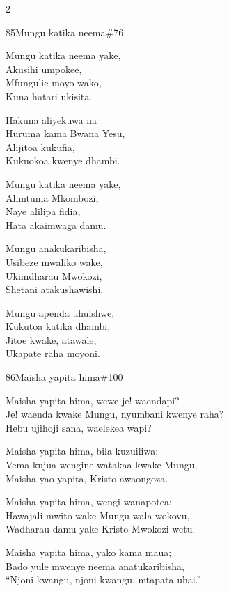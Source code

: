\begin{multicols}{2}
\begin{hymn}{85}{Mungu katika neema}{\#76}
\begin{stanza}
Mungu katika neema yake,\\
Akusihi umpokee,\\
Mfungulie moyo wako,\\
Kuna hatari ukisita.
\end{stanza}
\begin{chorus}
Hakuna aliyekuwa na\\
Huruma kama Bwana Yesu,\\
Alijitoa kukufia,\\
Kukuokoa kwenye dhambi.
\end{chorus}
\begin{stanza}
Mungu katika neema yake,\\
Alimtuma Mkombozi,\\
Naye alilipa fidia,\\
Hata akaimwaga damu.
\end{stanza}
\begin{stanza}
Mungu anakukaribisha,\\
Usibeze mwaliko wake,\\
Ukimdharau Mwokozi,\\
Shetani atakushawishi.
\end{stanza}
\begin{stanza}
Mungu apenda uhuishwe,\\
Kukutoa katika dhambi,\\
Jitoe kwake, atawale,\\
Ukapate raha moyoni.
\end{stanza}
\end{hymn}

\begin{hymn}{86}{Maisha yapita hima}{\#100}
\begin{stanza}
Maisha yapita hima, wewe je! waendapi?\\
Je! waenda kwake Mungu, nyumbani kwenye raha?\\
Hebu ujihoji sana, waelekea wapi?
\end{stanza}
\begin{stanza}
Maisha yapita hima, bila kuzuiliwa;\\
Vema kujua wengine watakaa kwake Mungu,\\
Maisha yao yapita, Kristo awaongoza.
\end{stanza}
\begin{stanza}
Maisha yapita hima, wengi wanapotea;\\
Hawajali mwito wake Mungu wala wokovu,\\
Wadharau damu yake Kristo Mwokozi wetu.
\end{stanza}
\begin{stanza}
Maisha yapita hima, yako kama maua;\\
Bado yule mwenye neema anatukaribisha,\\
``Njoni kwangu, njoni kwangu, mtapata uhai.''
\end{stanza}
\end{hymn}


\end{multicols}
